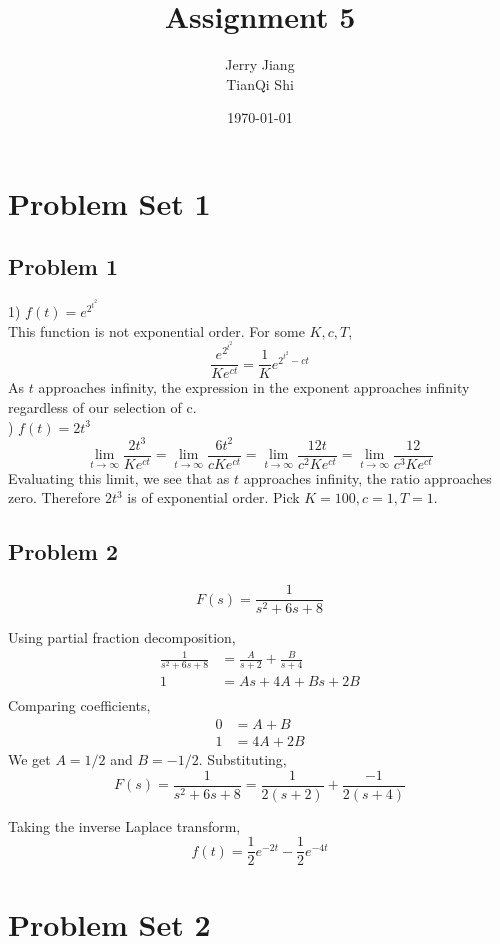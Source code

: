 \documentclass[titlepage]{article}
\title{Assignment 5}
\date{\today}
\author{Jerry Jiang\\ TianQi Shi}
\begin{document}
\maketitle

\noindent
\section{Problem Set 1}
\subsection{Problem 1}
1) $f(t) = e^{2^{t^2}}$ \\
This function is not exponential order. For some $K, c, T$,
$$\frac{e^{2^{t^2}}}{Ke^{ct}} = \frac{1}{K}e^{2^{t^2} - ct}$$
As $t$ approaches infinity, the expression in the exponent approaches infinity regardless of our selection of c.\\

) $f(t) = 2t^3$ \\
$$\lim_{t\to\infty} \frac{2t^3}{Ke^{ct}} = \lim_{t\to\infty} \frac{6t^2}{cKe^{ct}} = \lim_{t\to\infty} \frac{12t}{c^2Ke^{ct}} = \lim_{t\to\infty} \frac{12}{c^3Ke^{ct}}$$
Evaluating this limit, we see that as $t$ approaches infinity, the ratio approaches zero. Therefore $2t^3$ is of exponential order. Pick $K=100, c = 1, T = 1$.

\subsection{Problem 2}
$$F(s) = \frac{1}{s^2 + 6s + 8}$$

Using partial fraction decomposition,
\begin{align*}
  \frac{1}{s^2 + 6s + 8} &= \frac{A}{s+2} + \frac{B}{s+4} \\
  1 &= As + 4A + Bs + 2B \\
\end{align*}
Comparing coefficients,
\begin{align*}
  0 &= A + B \\
  1 &= 4A + 2B
\end{align*}
We get $A = 1/2$ and $B = -1/2$. Substituting,
$$F(s) = \frac{1}{s^2 + 6s + 8} = \frac{1}{2(s+2)} + \frac{-1}{2(s+4)}$$

Taking the inverse Laplace transform,
$$f(t) = \frac{1}{2}e^{-2t} - \frac{1}{2}e^{-4t}$$

\section{Problem Set 2}
\end{document}
